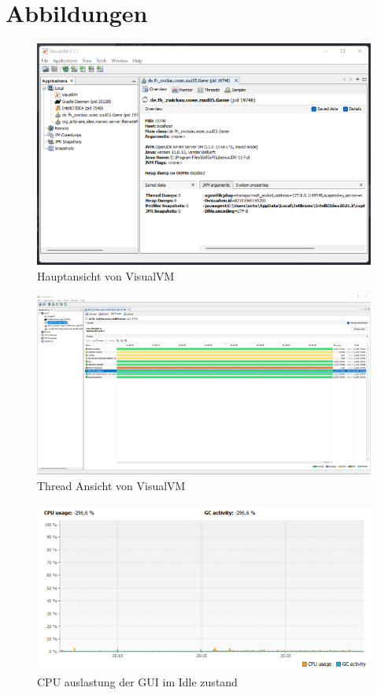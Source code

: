 \documentclass{article}
\begin{document}
\section{Abbildungen}
\begin{figure}[h]
  \centering
  \includegraphics{VisualVM_StartPage.png}
  \caption{Hauptansicht von VisualVM}
  \label{fig:VisualVM_MainPage}
\end{figure}

\begin{figure}
  \centering
  \includegraphics{VisualVM_Threads.png}
  \caption{Thread Ansicht von VisualVM}
  \label{fig:VisualVM_Threads}
\end{figure}

\begin{figure}
  \centering
  \includegraphics{GUI_CPU_idle.png}
  \caption{CPU auslastung der GUI im Idle zustand}
  \label{fig:GUI_CPU_idle}
\end{figure}
\end{document}
